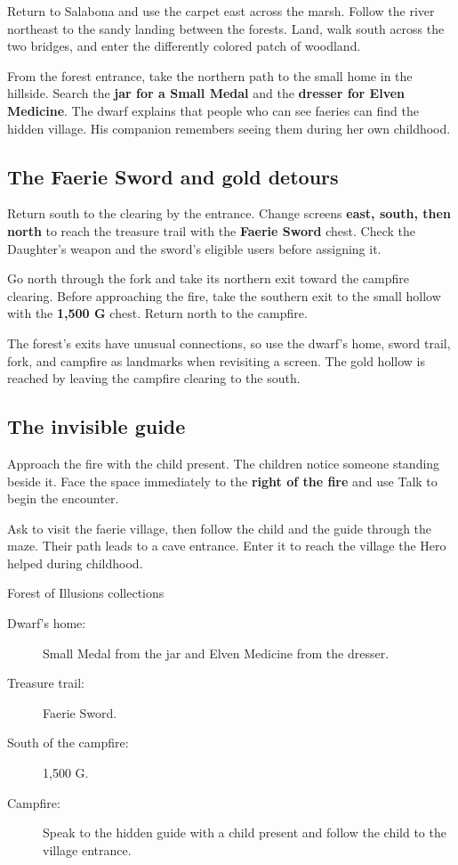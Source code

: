 Return to Salabona and use the carpet east across the marsh.
Follow the river northeast to the sandy landing between the
forests. Land, walk south across the two bridges, and enter
the differently colored patch of woodland.

From the forest entrance, take the northern path to the small
home in the hillside. Search the \textbf{jar for a Small Medal}
and the \textbf{dresser for Elven Medicine}. The dwarf explains
that people who can see faeries can find the hidden village.
His companion remembers seeing them during her own childhood.

\subsection*{The Faerie Sword and gold detours}

Return south to the clearing by the entrance. Change screens
\textbf{east, south, then north} to reach the treasure trail
with the \textbf{Faerie Sword} chest. Check the Daughter's
weapon and the sword's eligible users before assigning it.

Go north through the fork and take its northern exit toward
the campfire clearing. Before approaching the fire, take the
southern exit to the small hollow with the \textbf{1,500 G}
chest. Return north to the campfire.

The forest's exits have unusual connections, so use the dwarf's
home, sword trail, fork, and campfire as landmarks when revisiting
a screen. The gold hollow is reached by leaving the campfire
clearing to the south.

\subsection*{The invisible guide}

Approach the fire with the child present. The children notice
someone standing beside it. Face the space immediately to the
\textbf{right of the fire} and use Talk to begin the encounter.

Ask to visit the faerie village, then follow the child and the
guide through the maze. Their path leads to a cave entrance.
Enter it to reach the village the Hero helped during childhood.

\begin{routecheck}{Forest of Illusions collections}
\begin{description}
  \item[Dwarf's home:] Small Medal from the jar and Elven Medicine
    from the dresser.
  \item[Treasure trail:] Faerie Sword.
  \item[South of the campfire:] 1,500 G.
  \item[Campfire:] Speak to the hidden guide with a child present
    and follow the child to the village entrance.
\end{description}
\end{routecheck}

